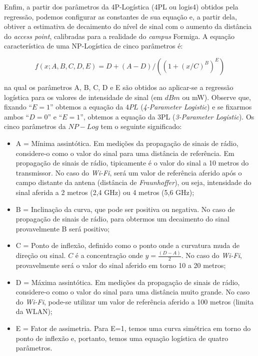 \documentclass[
	12pt,				%
	twoside,			%
	a4paper,			%
	english,			%
	french,				%
	spanish,			%
	brazil				%
	]{abntex2}
\begin{document}
Enfim, a partir dos parâmetros da 4P-Logística (4PL ou logis4) obtidos
pela regressão, podemos configurar as constantes de sua equação e, a
partir dela, obtiver a estimativa de decaimento do nível de sinal com o
aumento da distância do \emph{access point}, calibradas para a realidade
do \emph{campus} Formiga. A equação característica de uma NP-Logística
de cinco parâmetros é:

\begin{equation}
f(x; A,B,C,D,E) = D + (A-D) / ( (1+(x/C)^B)^E )
\end{equation}

na qual os parâmetros A, B, C, D e E são obtidos ao aplicar-se a
regressão logística para os valores de intensidade de sinal (em \(dBm\)
ou mW). Observe que, fixando ``\(E=1\)'' obtemos a equação da \(4PL\)
(\emph{4-Parameter Logistic}) e se fixarmos ambos ``\(D=0\)'' e
``\(E=1\)'', obtemos a equação da 3PL (\emph{3-Parameter Logistic}). Os
cinco parâmetros da \(NP-Log\) tem o seguinte significado:

\begin{itemize}
\item
  A = Mínima assintótica. Em medições da propagação de sinais de rádio,
  considere-o como o valor do sinal para uma distância de referência. Em
  propagação de sinais de rádio, tipicamente é o valor do sinal a 10
  metros do transmissor. No caso do \emph{Wi-Fi}, será um valor de
  referência aferido após o campo distante da antena (distância de
  \emph{Fraunhoffer}), ou seja, intensidade do sinal aferida a 2 metros
  (2,4 GHz) ou 4 metros (5,6 GHz);
\item
  B = Inclinação da curva, que pode ser positiva ou negativa. No caso de
  propagação de sinais de rádio, para obtermos um decaimento do sinal
  provavelmente B será positivo;
\item
  C = Ponto de inflexão, definido como o ponto onde a curvatura muda de
  direção ou sinal. \(C\) é a concentração onde \(y = \frac{(D-A)}{2}\).
  No caso do \emph{Wi-Fi}, provavelmente será o valor do sinal aferido
  em torno 10 a 20 metros;
\item
  D = Máxima assintótica. Em medições da propagação de sinais de rádio,
  considere-o como o valor do sinal para uma distância muito grande. No
  caso do \emph{Wi-Fi}, pode-se utilizar um valor de referência aferido
  a 100 metros (limita da WLAN);
\item
  E = Fator de assimetria. Para E=1, temos uma curva simétrica em torno
  do ponto de inflexão e, portanto, temos uma equação logística de
  quatro parâmetros.
\end{itemize}
\end{document}
